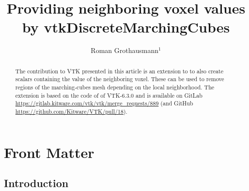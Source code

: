 \documentclass{InsightArticle}
\title{Providing neighboring voxel values by vtkDiscreteMarchingCubes}
\author{Roman Grothausmann$^{1}$}
\newcommand{\IJhandlerIDnumber}{xxxx}
\begin{document}
%
%
\IJhandlefooter{\IJhandlerIDnumber}


\ifpdf
\else
\fi


\maketitle


\ifhtml
\chapter*{Front Matter\label{front}}
\fi


\begin{abstract}
\noindent
The contribution to VTK presented in this article is an extension to  to also create  scalars containing the value of the neighboring voxel. These can be used to remove regions of the marching-cubes\citep{Lorensen1987} mesh depending on the local neighborhood.
The extension is based on the code of  of VTK-6.3.0 and is available on GitLab \url{https://gitlab.kitware.com/vtk/vtk/merge_requests/889} (and GitHub \url{https://github.com/Kitware/VTK/pull/18}).
\end{abstract}

\IJhandlenote{\IJhandlerIDnumber}

\tableofcontents

\pagebreak

\section{Introduction}
\end{document}
